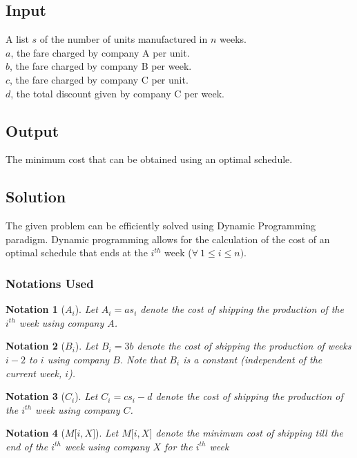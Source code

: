 \documentclass[12pt]{report}
\newtheorem{notation}{Notation}
\begin{document}
    \subsection*{Input}
    A list $s$ of the number of units manufactured in $n$ weeks. \\
    $a$, the fare charged by company A per unit. \\
    $b$, the fare charged by company B per week. \\
    $c$, the fare charged by company C per unit. \\
    $d$, the total discount given by company C per week.

    \subsection*{Output}
    The minimum cost that can be obtained using an optimal schedule.

    \subsection*{Solution}
    The given problem can be efficiently solved using Dynamic Programming paradigm.
    Dynamic programming allows for the calculation of the cost of an optimal schedule that ends at the $i^{th}$ week ($\forall \ 1 \le i \le n)$.

    \subsubsection*{Notations Used}
    \begin{notation}[$A_{i}$]
        Let $A_{i} = a s_{i}$ denote the cost of shipping the production of the $i^{th}$ week using company $A$.
    \end{notation}

    \begin{notation}[$B_{i}$]
        Let $B_{i} = 3b$ denote the cost of shipping the production of weeks $i-2$ to $i$ using company $B$.
        Note that $B_{i}$ is a constant (independent of the current week, $i$).
    \end{notation}

    \begin{notation}[$C_{i}$]
        Let $C_{i} = c s_{i} - d$ denote the cost of shipping the production of the $i^{th}$ week using company $C$.
    \end{notation}

    \begin{notation}[$M[{i, X]}$]
        Let $M[{i, X]}$ denote the minimum cost of shipping till the end of the $i^{th}$ week using company $X$ for the $i^{th}$ week
    \end{notation}
\end{document}
